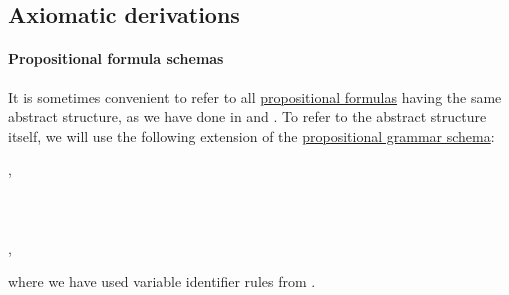 \subsection{Axiomatic derivations}\label{subsec:axiomatic_derivations}

\paragraph{Propositional formula schemas}

\begin{definition}\label{def:propositional_formula_schema}\mimprovised
  It is sometimes convenient to refer to all \hyperref[def:propositional_syntax/formula]{propositional formulas} having the same abstract structure, as we have done in  and . To refer to the abstract structure itself, we will use the following extension of the \hyperref[def:propositional_syntax]{propositional grammar schema}:
  \begin{bnf*}
     {}, \\
          {\bnftsq{\( \syntop \)} \bnfor \bnftsq{\( \synbot \)} \bnfor} \\
     \\
     \\
    ,
  \end{bnf*}
  where we have used variable identifier rules from .
\end{definition}
